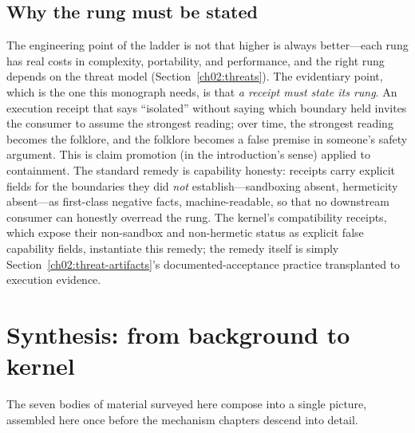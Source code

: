 \subsection{Why the rung must be stated}\label{ch02:rung-honesty}

The engineering point of the ladder is not that higher is always
better---each rung has real costs in complexity, portability, and
performance, and the right rung depends on the threat model
(Section~\ref{ch02:threats}). The evidentiary point, which is the
one this monograph needs, is that \emph{a receipt must state its
rung}. An execution receipt that says ``isolated'' without saying
which boundary held invites the consumer to assume the strongest
reading; over time, the strongest reading becomes the folklore, and
the folklore becomes a false premise in someone's safety argument.
This is claim promotion (in the introduction's sense) applied to
containment. The standard remedy is capability honesty: receipts
carry explicit fields for the boundaries they did \emph{not}
establish---sandboxing absent, hermeticity absent---as first-class
negative facts, machine-readable, so that no downstream consumer
can honestly overread the rung. The kernel's compatibility receipts,
which expose their non-sandbox and non-hermetic status as explicit
false capability fields, instantiate this remedy; the remedy itself
is simply Section~\ref{ch02:threat-artifacts}'s documented-acceptance
practice transplanted to execution evidence.

\section{Synthesis: from background to kernel}\label{ch02:synthesis}

The seven bodies of material surveyed here compose into a single
picture, assembled here once before the mechanism
chapters descend into detail.

